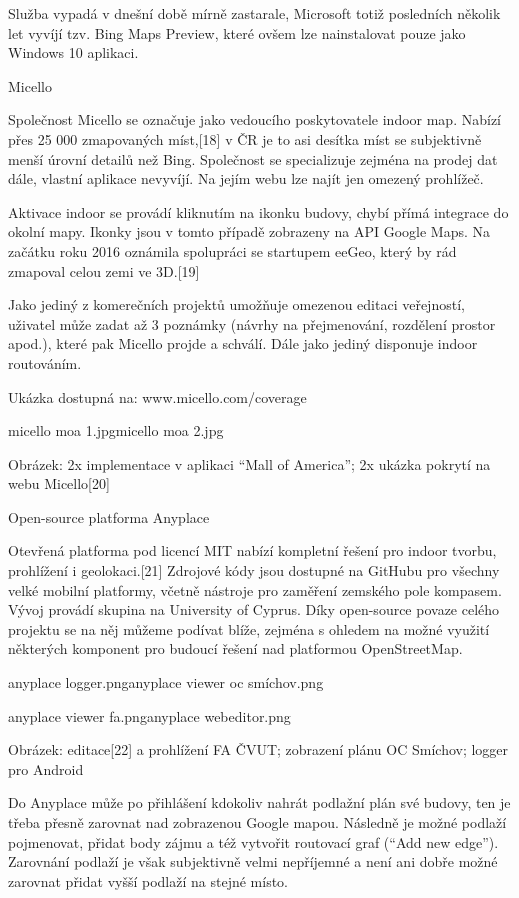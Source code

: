 Služba vypadá v dnešní době mírně zastarale, Microsoft totiž posledních několik let vyvíjí tzv. Bing Maps Preview, které ovšem lze nainstalovat pouze jako Windows 10 aplikaci.

Micello



Společnost Micello se označuje jako vedoucího poskytovatele indoor map. Nabízí přes 25 000 zmapovaných míst,[18] v ČR je to asi desítka míst se subjektivně menší úrovní detailů než Bing. Společnost se specializuje zejména na prodej dat dále, vlastní aplikace nevyvíjí. Na jejím webu lze najít jen omezený prohlížeč.

Aktivace indoor se provádí kliknutím na ikonku budovy, chybí přímá integrace do okolní mapy. Ikonky jsou v tomto případě zobrazeny na API Google Maps. Na začátku roku 2016 oznámila spolupráci se startupem eeGeo, který by rád zmapoval celou zemi ve 3D.[19]

Jako jediný z komerečních projektů umožňuje omezenou editaci veřejností, uživatel může zadat až 3 poznámky (návrhy na přejmenování, rozdělení prostor apod.), které pak Micello projde a schválí. Dále jako jediný disponuje indoor routováním.

Ukázka dostupná na: www.micello.com/coverage 

micello moa 1.jpgmicello moa 2.jpg

Obrázek: 2x implementace v aplikaci “Mall of America”; 2x ukázka pokrytí na webu Micello[20]

Open-source platforma Anyplace



Otevřená platforma pod licencí MIT nabízí kompletní řešení pro indoor tvorbu, prohlížení i geolokaci.[21] Zdrojové kódy jsou dostupné na GitHubu pro všechny velké mobilní platformy, včetně nástroje pro zaměření zemského pole kompasem. Vývoj provádí skupina na University of Cyprus. Díky open-source povaze celého projektu se na něj můžeme podívat blíže, zejména s ohledem na možné využití některých komponent pro budoucí řešení nad platformou OpenStreetMap.

anyplace logger.pnganyplace viewer oc smíchov.png

anyplace viewer fa.pnganyplace webeditor.png

Obrázek: editace[22] a prohlížení FA ČVUT;  zobrazení plánu OC Smíchov; logger pro Android

Do Anyplace může po přihlášení kdokoliv nahrát podlažní plán své budovy, ten je třeba přesně zarovnat nad zobrazenou Google mapou. Následně je možné podlaží pojmenovat, přidat body zájmu a též vytvořit routovací graf (“Add new edge”). Zarovnání podlaží je však subjektivně velmi nepříjemné a není ani dobře možné zarovnat přidat vyšší podlaží na stejné místo.

